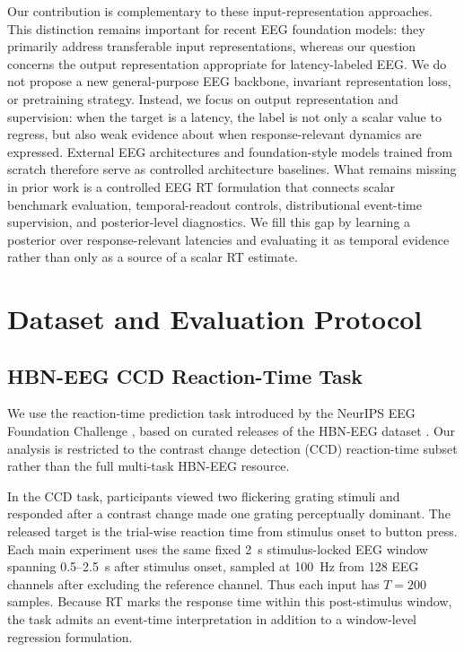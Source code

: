 \documentclass[12pt]{article}
\begin{document}
Our contribution is complementary to these input-representation approaches. This distinction remains important for recent EEG foundation models: they primarily address transferable input representations, whereas our question concerns the output representation appropriate for latency-labeled EEG. We do not propose a new general-purpose EEG backbone, invariant representation loss, or pretraining strategy. Instead, we focus on output representation and supervision: when the target is a latency, the label is not only a scalar value to regress, but also weak evidence about when response-relevant dynamics are expressed. External EEG architectures and foundation-style models trained from scratch therefore serve as controlled architecture baselines. What remains missing in prior work is a controlled EEG RT formulation that connects scalar benchmark evaluation, temporal-readout controls, distributional event-time supervision, and posterior-level diagnostics. We fill this gap by learning a posterior over response-relevant latencies and evaluating it as temporal evidence rather than only as a source of a scalar RT estimate.


\section{Dataset and Evaluation Protocol}
\label{sec:dataset_protocol}

\subsection{HBN-EEG CCD Reaction-Time Task}

We use the reaction-time prediction task introduced by the NeurIPS EEG Foundation Challenge \citep{EEGChallengeWebsite2025,EEGFoundationChallengeArxiv2025}, based on curated releases of the HBN-EEG dataset \citep{Shirazi2024HBNEEG}. Our analysis is restricted to the contrast change detection (CCD) reaction-time subset rather than the full multi-task HBN-EEG resource.

In the CCD task, participants viewed two flickering grating stimuli and responded after a contrast change made one grating perceptually dominant. The released target is the trial-wise reaction time from stimulus onset to button press. Each main experiment uses the same fixed 2~s stimulus-locked EEG window spanning 0.5--2.5~s after stimulus onset, sampled at 100~Hz from 128 EEG channels after excluding the reference channel. Thus each input has \(T=200\) samples. Because RT marks the response time within this post-stimulus window, the task admits an event-time interpretation in addition to a window-level regression formulation.
\end{document}
